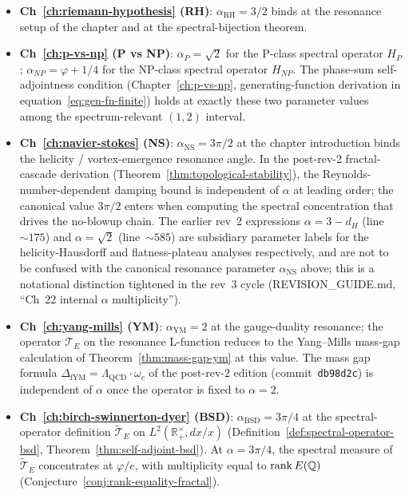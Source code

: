 \begin{itemize}
\item \textbf{Ch~\ref{ch:riemann-hypothesis} (RH)}: $\alpha_{\mathrm{RH}} = 3/2$ binds at the resonance setup of the chapter and at the spectral-bijection theorem.

\item \textbf{Ch~\ref{ch:p-vs-np} (P vs NP)}: $\alpha_P = \sqrt 2$ for the P-class spectral operator $H_P$; $\alpha_{NP} = \varphi + 1/4$ for the NP-class spectral operator $H_{NP}$. The phase-sum self-adjointness condition (Chapter~\ref{ch:p-vs-np}, generating-function derivation in equation~\eqref{eq:gen-fn-finite}) holds at exactly these two parameter values among the spectrum-relevant $(1, 2)$ interval.

\item \textbf{Ch~\ref{ch:navier-stokes} (NS)}: $\alpha_{\mathrm{NS}} = 3\pi/2$ at the chapter introduction binds the helicity / vortex-emergence resonance angle. In the post-rev-2 fractal-cascade derivation (Theorem~\ref{thm:topological-stability}), the Reynolds-number-dependent damping bound is independent of $\alpha$ at leading order; the canonical value $3\pi/2$ enters when computing the spectral concentration that drives the no-blowup chain. The earlier rev~2 expressions $\alpha = 3 - d_H$ (line~$\sim 175$) and $\alpha = \sqrt 2$ (line~$\sim 585$) are subsidiary parameter labels for the helicity-Hausdorff and flatness-plateau analyses respectively, and are not to be confused with the canonical resonance parameter $\alpha_{\mathrm{NS}}$ above; this is a notational distinction tightened in the rev~3 cycle (REVISION\_GUIDE.md, ``Ch~22 internal $\alpha$ multiplicity'').

\item \textbf{Ch~\ref{ch:yang-mills} (YM)}: $\alpha_{\mathrm{YM}} = 2$ at the gauge-duality resonance; the operator $\mathcal{T}_E$ on the resonance L-function reduces to the Yang--Mills mass-gap calculation of Theorem~\ref{thm:mass-gap-ym} at this value. The mass gap formula
\(
\Delta_{\mathrm{fYM}} = \Lambda_{\mathrm{QCD}} \cdot \omega_c
\)
of the post-rev-2 edition (commit~\texttt{db98d2c}) is independent of $\alpha$ once the operator is fixed to $\alpha = 2$.

\item \textbf{Ch~\ref{ch:birch-swinnerton-dyer} (BSD)}: $\alpha_{\mathrm{BSD}} = 3\pi/4$ at the spectral-operator definition $\widetilde{\mathcal{T}}_E$ on $L^2(\mathbb{R}_+^\times, dx/x)$ (Definition~\ref{def:spectral-operator-bsd}, Theorem~\ref{thm:self-adjoint-bsd}). At $\alpha = 3\pi/4$, the spectral measure of $\widetilde{\mathcal{T}}_E$ concentrates at $\varphi/e$, with multiplicity equal to $\rank E(\mathbb{Q})$ (Conjecture~\ref{conj:rank-equality-fractal}).


\end{itemize}
